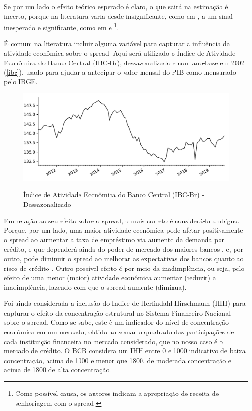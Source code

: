 \documentclass[a4paper,
               article,
               12pt,
               openany,
               oneside,
               english,
               brazil]{abntex2}
\numberwithin{equation}{section}
\begin{document}
    Se por um lado o efeito teórico esperado é claro, o que sairá na estimação é incerto, porque na literatura varia desde insignificante, como em \textcite{oreiro}, a um sinal inesperado e significante, como em \textcite{bignotto06} e \textcite{afanasieff02}\footnote{Como possível causa, os autores indicam a apropriação de receita de senhoriagem com o spread \cite[p.~25]{afanasieff02}}.
    
    É comum na literatura incluir alguma variável para capturar a influência da atividade econômica sobre o spread. Aqui será utilizado o Índice de Atividade Econômica do Banco Central (IBC-Br), dessazonalizado e com ano-base em 2002 (\autoref{ibc}), usado para ajudar a antecipar o valor mensal do PIB como mensurado pelo IBGE.

    \begin{figure}[hbt]
        \centering
        \caption{Índice de Atividade Econômica do Banco Central (IBC-Br) - Dessazonalizado}
        \includegraphics[width = \textwidth, scale=0.75]{ibc.pdf}
        \label{ibc}
    \end{figure}

    Em relação ao seu efeito sobre o spread, o mais correto é considerá-lo ambíguo. Porque, por um lado, uma maior atividade econômica pode afetar positivamente o spread ao aumentar a taxa de empréstimo via aumento da demanda por crédito, o que dependerá ainda do poder de mercado dos maiores bancos \textcite[626]{oreiro}, e, por outro, pode diminuir o spread ao melhorar as expectativas dos bancos quanto ao risco de crédito \textcite[24]{chaim}. Outro possível efeito é por meio da inadimplência, ou seja, pelo efeito de uma menor (maior) atividade econômica aumentar (reduzir) a inadimplência, fazendo com que o spread aumente (diminua).

    Foi ainda considerada a inclusão do Índice de Herfindahl-Hirschmann (IHH) para capturar o efeito da concentração estrutural no Sistema Financeiro Nacional sobre o spread. Como se sabe, este é um indicador do nível de concentração econômica em um mercado, obtido ao somar o quadrado das participações de cada instituição financeira no mercado considerado, que no nosso caso é o mercado de crédito. O BCB considera um IHH entre 0 e 1000 indicativo de baixa concentração, acima de 1000 e menor que 1800, de moderada concentração e acima de 1800 de alta concentração.
    
\end{document}
